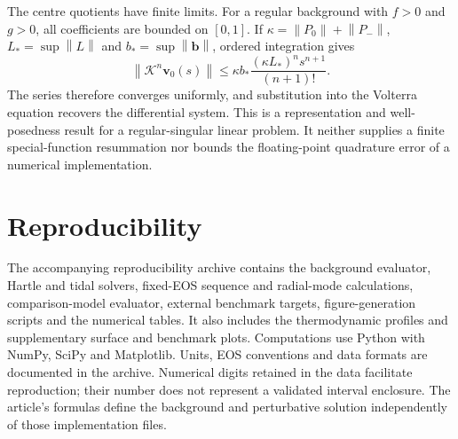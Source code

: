 \documentclass[aps,prd,reprint,a4paper,nofootinbib,floatfix]{revtex4-2}
\newcommand{\norm}[1]{\left\|#1\right\|}
\begin{document}
The centre quotients have finite limits. For a regular background with $f>0$ and $g>0$, all coefficients are bounded on $[0,1]$. If $\kappa=\norm{P_0}+\norm{P_-}$, $L_* =\sup\norm L$ and $b_* =\sup\norm{\boldsymbol b}$, ordered integration gives
\begin{equation}
 \norm{\mathcal K^n\boldsymbol v_0(s)}
 \le\kappa b_*\frac{(\kappa L_*)^n s^{n+1}}{(n+1)!}.
\end{equation}
The series therefore converges uniformly, and substitution into the Volterra equation recovers the differential system. This is a representation and well-posedness result for a regular-singular linear problem. It neither supplies a finite special-function resummation nor bounds the floating-point quadrature error of a numerical implementation.

\section{Reproducibility}
The accompanying reproducibility archive contains the background evaluator, Hartle and tidal solvers, fixed-EOS sequence and radial-mode calculations, comparison-model evaluator, external benchmark targets, figure-generation scripts and the numerical tables. It also includes the thermodynamic profiles and supplementary surface and benchmark plots. Computations use Python with NumPy, SciPy and Matplotlib. Units, EOS conventions and data formats are documented in the archive. Numerical digits retained in the data facilitate reproduction; their number does not represent a validated interval enclosure. The article's formulas define the background and perturbative solution independently of those implementation files.
\end{document}

